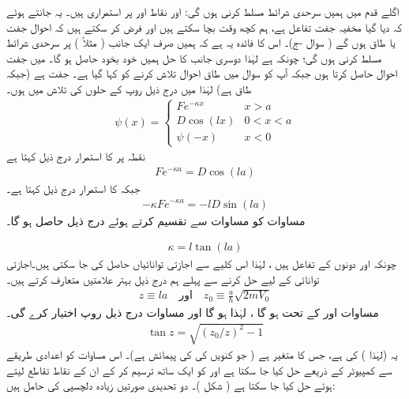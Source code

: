  اگلے قدم میں ہمیں سرحدی شرائط مسلط کرنی  ہوں گی: اور  نقاط  اور پر استمراری ہیں۔ یہ جانتے ہوئے کہ دیا گیا مخفیہ جفت تفاعل ہے، ہم کچھ وقت بچا سکتے ہیں اور فرض کر سکتے ہیں کہ احوال  جفت  یا طاق ہوں گے ( سوال -ج)۔ اس کا فائدہ یہ ہے کہ ہمیں صرف ایک جانب ( مثلاً )  پر سرحدی شرائط مسلط کرنی ہوں گی؛ چونکہ ہے لہٰذا دوسری جانب کا حل ہمیں خود بخود حاصل ہو گا۔ میں جفت احوال  حاصل کرتا ہوں جبکہ آپ کو سوال  میں طاق احوال  تلاش کرنے کو کہا گیا ہے۔ جفت ہے (جبکہ طاق ہے)  لہٰذا میں درج ذیل روپ کے حلوں کی تلاش میں ہوں۔ 
\begin{align}\label{مساوات_شروڈنگر_تلاش_تفاعلات}
\psi(x)=
\begin{cases}
Fe^{-\kappa x} & x> a\\
D\cos(l x) & 0< x < a\\
\psi(-x) & x< 0
\end{cases}
\end{align}
نقطہ پر  کا  استمرار درج ذیل کہتا  ہے 
\begin{align}\label{مساوات_شروڈنگر_استمرار_مستقل_الف}
 Fe^{-\kappa a}=D\cos(la) 
 \end{align}
 جبکہ  کا  استمرار درج ذیل کہتا ہے۔
 \begin{align}\label{مساوات_شروڈنگر_استمرار_مستقل_ب}
 -\kappa Fe^{-\kappa a}=-lD\sin(la) 
 \end{align} 
 مساوات  کو مساوات  سے تقسیم کرتے ہوئے درج ذیل حاصل ہو گا۔

\begin{align}\label{مساوات_شروڈنگر_حل_کپا}
\kappa =l\tan(la) 
 \end{align}
 چونکہ  اور   دونوں  کے تفاعل ہیں ، لہٰذا اس کلیے سے اجازتی توانائیاں حاصل کی جا سکتی ہیں۔اجازتی توانائی کے لیے حل کرنے سے پہلے ہم درج ذیل بہتر علامتیں متعارف کرتے ہیں۔
\begin{align}
z\equiv l a \quad \text{اور}\quad z_0\equiv\frac{a}{\hslash}\sqrt{2mV_0}
\end{align} 
مساوات  اور  کے تحت  ہو گا ، لہٰذا   ہو گا اور مساوات   درج ذیل روپ اختیار کرے گی۔
\begin{align}\label{مساوات_غیر_تابع_شروڈنگر_ترسیمی_حل}
\tan z=\sqrt{(z_{0}/z)^{2}-1} 
\end{align}
 یہ  (لہٰذا ) کی    ہے،  جس کا متغیر  ہے ( جو کنویں کی کی  پیمائش ہے)۔ اس مساوات  کو اعدادی طریقے  سے کمپیوٹر کے ذریعے حل کیا جا سکتا  ہے   اور  کو ایک ساتھ ترسیم کر کے ان کے نقاط تقاطع لیتے ہوئے حل کیا جا سکتا ہے ( شکل )۔ دو تحدیدی صورتیں زیادہ دلچسپی کی حامل ہیں:
 
